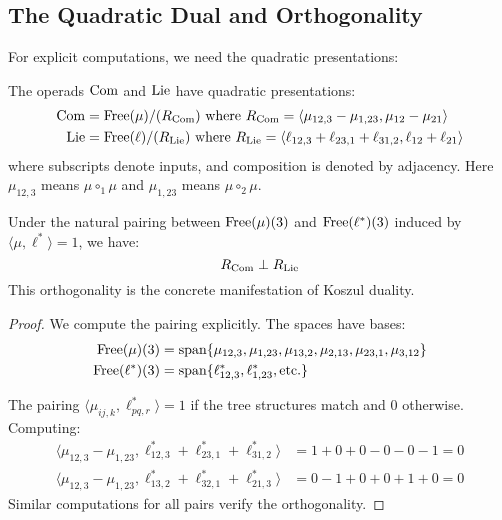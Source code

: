 \subsection{The Quadratic Dual and Orthogonality}
 
For explicit computations, we need the quadratic presentations:
 
\begin{proposition}
The operads $\operatorname{Com}$ and $\operatorname{Lie}$ have quadratic presentations:
\begin{align}
\operatorname{Com} &= \operatorname{Free}(\mu)/(R_{\operatorname{Com}}) \text{ where } R_{\operatorname{Com}} = \langle \mu_{12,3} - \mu_{1,23}, \mu_{12} - \mu_{21} \rangle \\
\operatorname{Lie} &= \operatorname{Free}(\ell)/(R_{\operatorname{Lie}}) \text{ where } R_{\operatorname{Lie}} = \langle \ell_{12,3} + \ell_{23,1} + \ell_{31,2}, \ell_{12} + \ell_{21} \rangle
\end{align}
where subscripts denote inputs, and composition is denoted by adjacency. Here $\mu_{12,3}$ means $\mu \circ_1 \mu$ and $\mu_{1,23}$ means $\mu \circ_2 \mu$.
\end{proposition}
 
\begin{proposition}[Orthogonality]\label{prop:orthogonal}
Under the natural pairing between $\operatorname{Free}(\mu)(3)$ and $\operatorname{Free}(\ell^*)(3)$ induced by $\langle \mu, \ell^* \rangle = 1$, we have:
\[
R_{\operatorname{Com}} \perp R_{\operatorname{Lie}}
\]
This orthogonality is the concrete manifestation of Koszul duality.
\end{proposition}
 
\begin{proof}
We compute the pairing explicitly. The spaces have bases:
\begin{align}
\operatorname{Free}(\mu)(3) &= \text{span}\{\mu_{12,3}, \mu_{1,23}, \mu_{13,2}, \mu_{2,13}, \mu_{23,1}, \mu_{3,12}\} \\
\operatorname{Free}(\ell^*)(3) &= \text{span}\{\ell^*_{12,3}, \ell^*_{1,23}, \text{etc.}\}
\end{align}
 
The pairing $\langle \mu_{ij,k}, \ell^*_{pq,r} \rangle = 1$ if the tree structures match and $0$ otherwise. Computing:
\begin{align}
\langle \mu_{12,3} - \mu_{1,23}, \ell^*_{12,3} + \ell^*_{23,1} + \ell^*_{31,2} \rangle &= 1 + 0 + 0 - 0 - 0 - 1 = 0 \\
\langle \mu_{12,3} - \mu_{1,23}, \ell^*_{13,2} + \ell^*_{32,1} + \ell^*_{21,3} \rangle &= 0 - 1 + 0 + 0 + 1 + 0 = 0
\end{align}
Similar computations for all pairs verify the orthogonality.
\end{proof}
